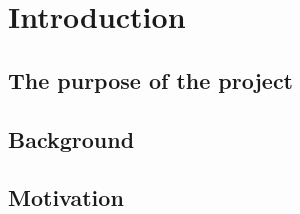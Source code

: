 \chapter{Introduction}
\section{The purpose of the project}
\section{Background}
\section{Motivation}

